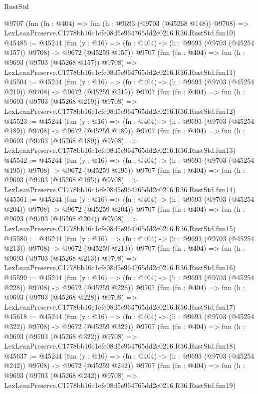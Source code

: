\begin{lexlean}{RustStd}
\begin{coremodule}
    @9707
    (fun (fn : @404) =>
    fun (h : @9693 (@9703 (@45268 @148)) @9708) =>
    LexLeanPreserve.C1778bb16c1cfe08d5e964765dd2c0216.R36.RustStd.fun10)
@45485 := @45244
    (fun (y : @16) => (fn : @404) -> (h : @9693 (@9703 (@45254 @157)) @9708) -> @9672 (@45259 @157))
    @9707
    (fun (fn : @404) =>
    fun (h : @9693 (@9703 (@45268 @157)) @9708) =>
    LexLeanPreserve.C1778bb16c1cfe08d5e964765dd2c0216.R36.RustStd.fun11)
@45504 := @45244
    (fun (y : @16) => (fn : @404) -> (h : @9693 (@9703 (@45254 @219)) @9708) -> @9672 (@45259 @219))
    @9707
    (fun (fn : @404) =>
    fun (h : @9693 (@9703 (@45268 @219)) @9708) =>
    LexLeanPreserve.C1778bb16c1cfe08d5e964765dd2c0216.R36.RustStd.fun12)
@45523 := @45244
    (fun (y : @16) => (fn : @404) -> (h : @9693 (@9703 (@45254 @189)) @9708) -> @9672 (@45259 @189))
    @9707
    (fun (fn : @404) =>
    fun (h : @9693 (@9703 (@45268 @189)) @9708) =>
    LexLeanPreserve.C1778bb16c1cfe08d5e964765dd2c0216.R36.RustStd.fun13)
@45542 := @45244
    (fun (y : @16) => (fn : @404) -> (h : @9693 (@9703 (@45254 @195)) @9708) -> @9672 (@45259 @195))
    @9707
    (fun (fn : @404) =>
    fun (h : @9693 (@9703 (@45268 @195)) @9708) =>
    LexLeanPreserve.C1778bb16c1cfe08d5e964765dd2c0216.R36.RustStd.fun14)
@45561 := @45244
    (fun (y : @16) => (fn : @404) -> (h : @9693 (@9703 (@45254 @204)) @9708) -> @9672 (@45259 @204))
    @9707
    (fun (fn : @404) =>
    fun (h : @9693 (@9703 (@45268 @204)) @9708) =>
    LexLeanPreserve.C1778bb16c1cfe08d5e964765dd2c0216.R36.RustStd.fun15)
@45580 := @45244
    (fun (y : @16) => (fn : @404) -> (h : @9693 (@9703 (@45254 @213)) @9708) -> @9672 (@45259 @213))
    @9707
    (fun (fn : @404) =>
    fun (h : @9693 (@9703 (@45268 @213)) @9708) =>
    LexLeanPreserve.C1778bb16c1cfe08d5e964765dd2c0216.R36.RustStd.fun16)
@45599 := @45244
    (fun (y : @16) => (fn : @404) -> (h : @9693 (@9703 (@45254 @228)) @9708) -> @9672 (@45259 @228))
    @9707
    (fun (fn : @404) =>
    fun (h : @9693 (@9703 (@45268 @228)) @9708) =>
    LexLeanPreserve.C1778bb16c1cfe08d5e964765dd2c0216.R36.RustStd.fun17)
@45618 := @45244
    (fun (y : @16) => (fn : @404) -> (h : @9693 (@9703 (@45254 @322)) @9708) -> @9672 (@45259 @322))
    @9707
    (fun (fn : @404) =>
    fun (h : @9693 (@9703 (@45268 @322)) @9708) =>
    LexLeanPreserve.C1778bb16c1cfe08d5e964765dd2c0216.R36.RustStd.fun18)
@45637 := @45244
    (fun (y : @16) => (fn : @404) -> (h : @9693 (@9703 (@45254 @242)) @9708) -> @9672 (@45259 @242))
    @9707
    (fun (fn : @404) =>
    fun (h : @9693 (@9703 (@45268 @242)) @9708) =>
    LexLeanPreserve.C1778bb16c1cfe08d5e964765dd2c0216.R36.RustStd.fun19)

\end{coremodule}
\end{lexlean}
